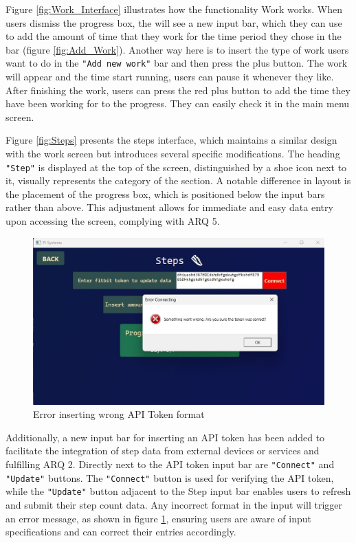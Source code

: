 \documentclass[11pt]{article}
\begin{document}
\newpage

Figure \ref{fig:Work_Interface} illustrates how the functionality Work works. When users dismiss
the progress box, the will see a new input bar, which they can use to add the amount of time that
they work for the time period they chose in the bar (figure \ref{fig:Add_Work}). Another way here
is to insert the type of work users want to do in the \texttt{"Add new work"} bar and then press 
the plus button. The work will appear and the time start running, users can pause it whenever they
like. After finishing the work, users can press the red plus button to add the time they have been
working for to the progress. They can easily check it in the main menu screen.\par

Figure \ref{fig:Steps} presents the steps interface, which maintains a similar design
with the work screen but introduces several specific modifications. The heading \texttt{"Step"} is
displayed at the top of the screen, distinguished by a shoe icon next to it, visually represents the
category of the section. A notable difference in layout is the placement of
the progress box, which is positioned below the input bars rather than above. This adjustment
allows for immediate and easy data entry upon accessing the screen, complying with ARQ 5.\par

\vspace{-7pt}
\begin{figure}[!ht]
  \centering
  \includegraphics[width = 0.5\linewidth]{Error}
  \caption{Error inserting wrong API Token format}
  \label{fig:Error}
\end{figure}
\vspace{-7pt}

Additionally, a new input bar for inserting an API token has been added to facilitate the integration of step data from
external devices or services and fulfilling ARQ 2. Directly next to the API token input bar are \texttt{"Connect"} and 
\texttt{"Update"} buttons. The \texttt{"Connect"} button is used for verifying the API token, while the \texttt{"Update"}
button adjacent to the Step input bar enables users to refresh and submit their step count 
data. Any incorrect format in the input will trigger an error message, as shown in 
figure \ref{fig:Error}, ensuring users are aware of input specifications and can correct their entries accordingly.\par
\end{document}
